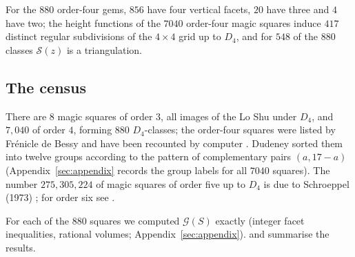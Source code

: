 For the $880$ order-four gems, $856$ have four vertical facets, $20$ have three and $4$ have two; the height functions of the $7040$ order-four magic squares induce $417$ distinct regular subdivisions of the $4\times4$ grid up to $D_4$, and for $548$ of the $880$ classes $\mathcal S(z)$ is a triangulation.

\subsection{The census}
\label{sec:census-4}

There are $8$ magic squares of order $3$, all images of the Lo Shu under $D_4$, and $7{,}040$ of order $4$, forming $880$ $D_4$-classes; the order-four squares were listed by Fr\'enicle de Bessy \cite{frenicle1693} and have been recounted by computer \cite{beck2010enumeration}.
Dudeney sorted them into twelve groups according to the pattern of complementary pairs $(a,17-a)$ \cite{dudeney1917amusements} (Appendix~\ref{sec:appendix} records the group labels for all $7040$ squares).
The number $275{,}305{,}224$ of magic squares of order five up to $D_4$ is due to Schroeppel (1973) \cite{gardner1976}; for order six see \cite{pinn1998number,mino2024order6,trump_howmany}.

For each of the $880$ squares we computed $\mathcal G(S)$ exactly (integer facet inequalities, rational volumes; Appendix~\ref{sec:appendix}).
 and  summarise the results.

